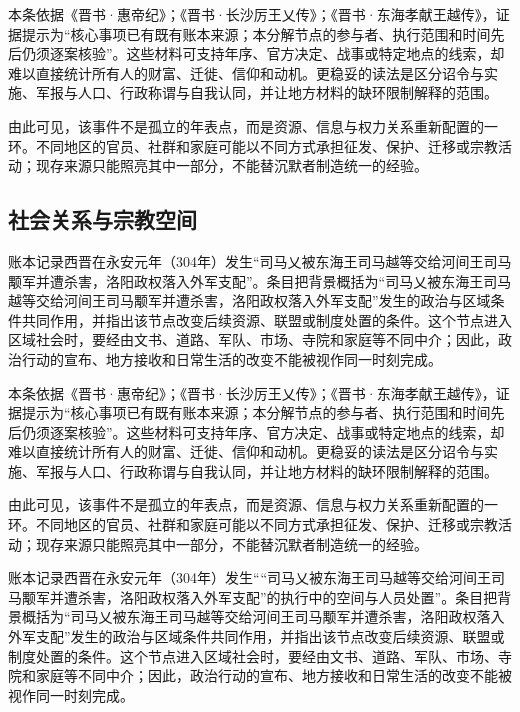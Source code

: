 本条依据《晋书·惠帝纪》；《晋书·长沙厉王乂传》；《晋书·东海孝献王越传》，证据提示为“核心事项已有既有账本来源；本分解节点的参与者、执行范围和时间先后仍须逐案核验”。这些材料可支持年序、官方决定、战事或特定地点的线索，却难以直接统计所有人的财富、迁徙、信仰和动机。更稳妥的读法是区分诏令与实施、军报与人口、行政称谓与自我认同，并让地方材料的缺环限制解释的范围。

由此可见，该事件不是孤立的年表点，而是资源、信息与权力关系重新配置的一环。不同地区的官员、社群和家庭可能以不同方式承担征发、保护、迁移或宗教活动；现存来源只能照亮其中一部分，不能替沉默者制造统一的经验。

\subsection{社会关系与宗教空间}

账本记录西晋在永安元年（304年）发生“司马乂被东海王司马越等交给河间王司马颙军并遭杀害，洛阳政权落入外军支配”。条目把背景概括为“司马乂被东海王司马越等交给河间王司马颙军并遭杀害，洛阳政权落入外军支配”发生的政治与区域条件共同作用，并指出该节点改变后续资源、联盟或制度处置的条件。这个节点进入区域社会时，要经由文书、道路、军队、市场、寺院和家庭等不同中介；因此，政治行动的宣布、地方接收和日常生活的改变不能被视作同一时刻完成。

本条依据《晋书·惠帝纪》；《晋书·长沙厉王乂传》；《晋书·东海孝献王越传》，证据提示为“核心事项已有既有账本来源；本分解节点的参与者、执行范围和时间先后仍须逐案核验”。这些材料可支持年序、官方决定、战事或特定地点的线索，却难以直接统计所有人的财富、迁徙、信仰和动机。更稳妥的读法是区分诏令与实施、军报与人口、行政称谓与自我认同，并让地方材料的缺环限制解释的范围。

由此可见，该事件不是孤立的年表点，而是资源、信息与权力关系重新配置的一环。不同地区的官员、社群和家庭可能以不同方式承担征发、保护、迁移或宗教活动；现存来源只能照亮其中一部分，不能替沉默者制造统一的经验。

账本记录西晋在永安元年（304年）发生““司马乂被东海王司马越等交给河间王司马颙军并遭杀害，洛阳政权落入外军支配”的执行中的空间与人员处置”。条目把背景概括为“司马乂被东海王司马越等交给河间王司马颙军并遭杀害，洛阳政权落入外军支配”发生的政治与区域条件共同作用，并指出该节点改变后续资源、联盟或制度处置的条件。这个节点进入区域社会时，要经由文书、道路、军队、市场、寺院和家庭等不同中介；因此，政治行动的宣布、地方接收和日常生活的改变不能被视作同一时刻完成。

